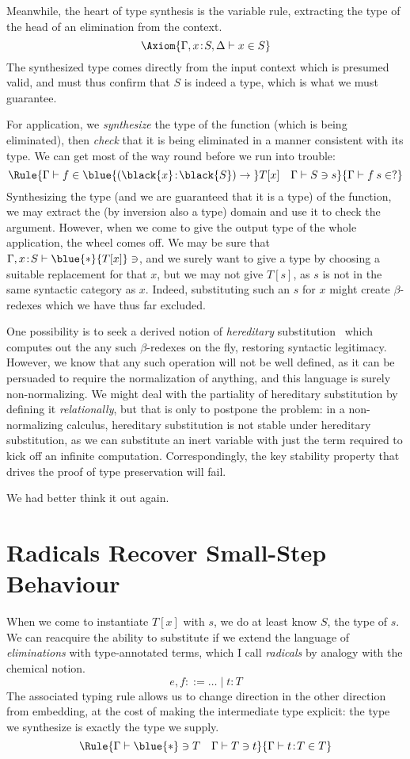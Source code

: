 \documentclass[natbib]{article}
\newcommand{\type}{\blue{\ast}}
\newcommand{\hb}{\!:\!}
\newcommand{\PI}[2]{\blue{(\black{#1}\hb \black{#2})\to\;}}
\begin{document}
Meanwhile, the heart of type synthesis is the variable rule, extracting the type of the head of an elimination from the context.
\[
\Axiom{\SYN{\Gamma,x\hb S,\Delta}{x}{S}}
\]
The synthesized type comes directly from the input context which is presumed valid, and must thus confirm that $S$ is indeed a type, which is what we must guarantee.

For application, we \emph{synthesize} the type of the function (which is being eliminated), then \emph{check} that it is being eliminated in a manner consistent with its type.
We can get most of the way round before we run into trouble:
\[
\Rule{\SYN\Gamma f {\PI xS T[x]} \quad \CHK\Gamma Ss}
     {\SYN\Gamma{f\:s}{?}}
\]
Synthesizing the type (and we are guaranteed that it is a type) of the function, we may extract the (by inversion also a type) domain and use it to check the argument. However, when we come to give the output type of the whole application, the wheel comes off. We may be sure that $\CHK{\Gamma,x\hb S}\type{T[x]}$, and we surely want to give a type by choosing a suitable replacement for that $x$, but we may not give $T[s]$, as $s$ is not in the same syntactic category as $x$. Indeed, substituting such an $s$ for $x$ might create $\beta$-redexes which we have thus far excluded.

One possibility is to seek a derived notion of \emph{hereditary} substitution~\cite{DBLP:conf/types/WatkinsCPW03} which computes out the any such $\beta$-redexes on the fly, restoring syntactic legitimacy. However, we know that any such operation will not be well defined, as it can be persuaded to require the normalization of anything, and this language is surely non-normalizing. We might deal with the partiality of hereditary substitution by defining it \emph{relationally}, but that is only to postpone the problem: in a non-normalizing calculus, hereditary substitution is not stable under hereditary substitution, as we can substitute an inert variable with just the term required to kick off an infinite computation. Correspondingly, the key stability property that drives the proof of type preservation will fail.

We had better think it out again.


\section{Radicals Recover Small-Step Behaviour}

When we come to instantiate $T[x]$ with $s$, we do at least know $S$, the type of $s$. We can reacquire the ability to substitute if we extend the language of \emph{eliminations} with type-annotated terms, which I call \emph{radicals} by analogy with the chemical notion.
\[
e,f ::= \ldots \;|\; t\hb T
\]
The associated typing rule allows us to change direction in the other direction from embedding, at the cost of making the intermediate type explicit: the type we synthesize is exactly the type we supply.
\[\Rule{\CHK\Gamma\type T\quad \CHK\Gamma Tt}
       {\SYN\Gamma{t\hb T}T}
\]
\end{document}
